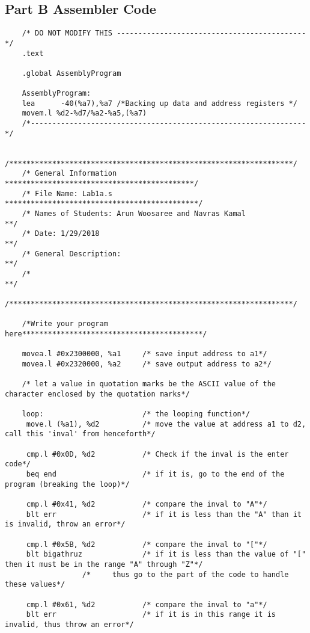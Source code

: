 \documentclass[letterpaper]{article}
\begin{document}
  \subsection{Part B Assembler Code}
    \begin{lstlisting}
    /* DO NOT MODIFY THIS --------------------------------------------*/
    .text

    .global AssemblyProgram

    AssemblyProgram:
    lea      -40(%a7),%a7 /*Backing up data and address registers */
    movem.l %d2-%d7/%a2-%a5,(%a7)
    /*----------------------------------------------------------------*/

    /******************************************************************/
    /* General Information ********************************************/
    /* File Name: Lab1a.s *********************************************/
    /* Names of Students: Arun Woosaree and Navras Kamal             **/
    /* Date: 1/29/2018                                               **/
    /* General Description:                                          **/
    /*                                                               **/
    /******************************************************************/

    /*Write your program here******************************************/

    movea.l #0x2300000, %a1 	/* save input address to a1*/
    movea.l #0x2320000, %a2 	/* save output address to a2*/

    /* let a value in quotation marks be the ASCII value of the character enclosed by the quotation marks*/

    loop: 						/* the looping function*/
     move.l (%a1), %d2 			/* move the value at address a1 to d2, call this 'inval' from henceforth*/

     cmp.l #0x0D, %d2			/* Check if the inval is the enter code*/
     beq end					/* if it is, go to the end of the program (breaking the loop)*/

     cmp.l #0x41, %d2 			/* compare the inval to "A"*/
     blt err					/* if it is less than the "A" than it is invalid, throw an error*/

     cmp.l #0x5B, %d2 			/* compare the inval to "["*/
     blt bigathruz				/* if it is less than the value of "[" then it must be in the range "A" through "Z"*/
                  /*	 thus go to the part of the code to handle these values*/

     cmp.l #0x61, %d2 			/* compare the inval to "a"*/
     blt err					/* if it is in this range it is invalid, thus throw an error*/


\end{lstlisting}
\end{document}
